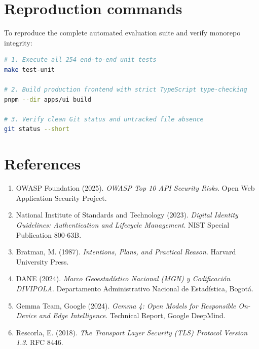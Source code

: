 \documentclass[11pt,a4paper]{article}
\begin{document}
\section{Reproduction commands}

To reproduce the complete automated evaluation suite and verify monorepo integrity:

\begin{lstlisting}[language=bash, caption={Local verification instructions.}]
# 1. Execute all 254 end-to-end unit tests
make test-unit

# 2. Build production frontend with strict TypeScript type-checking
pnpm --dir apps/ui build

# 3. Verify clean Git status and untracked file absence
git status --short
\end{lstlisting}

\section{References}
\begin{enumerate}[leftmargin=*]
    \item OWASP Foundation (2025). \textit{OWASP Top 10 API Security Risks}. Open Web Application Security Project.
    \item National Institute of Standards and Technology (2023). \textit{Digital Identity Guidelines: Authentication and Lifecycle Management}. NIST Special Publication 800-63B.
    \item Bratman, M. (1987). \textit{Intentions, Plans, and Practical Reason}. Harvard University Press.
    \item DANE (2024). \textit{Marco Geoestad\'istico Nacional (MGN) y Codificaci\'on DIVIPOLA}. Departamento Administrativo Nacional de Estad\'istica, Bogot\'a.
    \item Gemma Team, Google (2024). \textit{Gemma 4: Open Models for Responsible On-Device and Edge Intelligence}. Technical Report, Google DeepMind.
    \item Rescorla, E. (2018). \textit{The Transport Layer Security (TLS) Protocol Version 1.3}. RFC 8446.
\end{enumerate}
\end{document}
